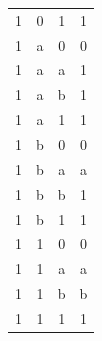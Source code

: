 \documentclass[11pt]{article}
\begin{document}
\begin{table}[ht]
\begin{minipage}{0.3\textwidth}
{\begin{tabular}{cccc}
1 & 0 & 1 & 1 \\
1 & a & 0 & 0 \\
1 & a & a & 1 \\
1 & a & b & 1 \\
1 & a & 1 & 1 \\
1 & b & 0 & 0 \\
1 & b & a & a \\
1 & b & b & 1 \\
1 & b & 1 & 1 \\
1 & 1 & 0 & 0 \\
1 & 1 & a & a \\
1 & 1 & b & b \\
1 & 1 & 1 & 1 \\
\hline
\end{tabular}%
}
\end{minipage}

\end{table}




\newpage

$\;$\\
\end{document}
